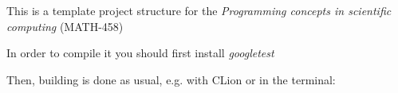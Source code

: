 This is a template project structure for the {\itshape Programming concepts in scientific computing} (MATH-\/458)

In order to compile it you should first install {\itshape googletest}


\begin{DoxyCode}{0}

\end{DoxyCode}


Then, building is done as usual, e.\+g. with CLion or in the terminal\+:


\begin{DoxyCode}{0}

\end{DoxyCode}
 